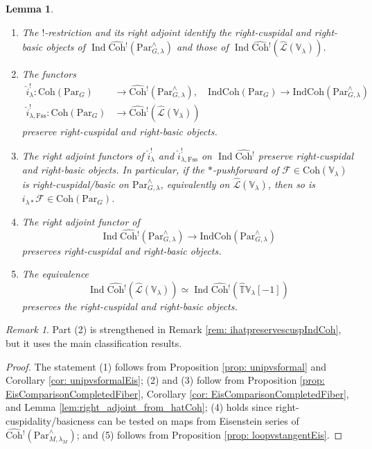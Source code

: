 \documentclass{amsart}
\newtheorem{lemma}[theorem]{Lemma}
\theoremstyle{definition}
\theoremstyle{remark}
\newtheorem{remark}[theorem]{Remark}
\numberwithin{equation}{section}
\DeclareMathOperator{\Ind}{Ind}
\newcommand{\mc}{\mathcal}
\newcommand{\wh}{\widehat}
\newcommand{\Par}{\mathrm{Par}}
\newcommand{\Fss}{\mathrm{Fss}}
\newcommand{\IndCoh}{\mathrm{IndCoh}}
\newcommand{\Coh}{\mathrm{Coh}}
\newcommand{\V}{\mathbb{V}}
\newcommand{\T}{\mathbb{T}}
\begin{document}
\begin{lemma}{\label{lem: ihatpreservescusp}}
\begin{enumerate} 
    \item The $!$-restriction and its right adjoint identify the right-cuspidal and right-basic objects of $\Ind\wh{\Coh}{}^! (\Par^\wedge_{G,\lambda})$ and those of $\Ind\wh{\Coh}{}^! (\wh{\mc L}(\V_\lambda))$. 
    \item The functors
\begin{align*}
\wh{i}_{\lambda}^!\colon \Coh(\Par_G) &\to \wh{\Coh}{}^! (\Par^\wedge_{G,\lambda}), \quad \IndCoh(\Par_G) \to \IndCoh (\Par^\wedge_{G,\lambda}) \\
\wh{i}_{\lambda, \Fss}^!\colon \Coh(\Par_G) &\to \wh{\Coh}{}^! (\wh{\mc L}(\V_\lambda))
\end{align*}
preserve right-cuspidal and right-basic objects. 
    \item The right adjoint functors of $\wh{i}_{\lambda}^!$ and $\wh{i}_{\lambda, \Fss}^!$ on $\Ind\wh{\Coh}{}^!$ preserve right-cuspidal and right-basic objects. In particular, if the $*$-pushforward of $\mc F\in \Coh(\V_\lambda)$ is right-cuspidal/basic on $\Par^\wedge_{G,\lambda}$, equivalently on $\wh{\mc L}(\V_\lambda)$, then so is $i_{\lambda*}\mc F\in \Coh(\Par_G)$.   
    \item The right adjoint functor of 
    \[
    \Ind\wh{\Coh}{}^!(\Par^\wedge_{G,\lambda}) \to \IndCoh(\Par^\wedge_{G,\lambda})
    \]
    preserves right-cuspidal and right-basic objects. 
    \item The equivalence 
    \[
    \Ind\wh{\Coh}{}^! (\wh{\mc L}(\V_\lambda))\simeq
    \Ind\wh{\Coh}{}^! (\wh{\T}\V_\lambda[-1]) 
    \]
    preserves the right-cuspidal and right-basic objects. 
\end{enumerate}
\end{lemma}

\begin{remark}
Part (2) is strengthened in Remark \ref{rem: ihatpreservescuspIndCoh}, but it uses the main classification results.     
\end{remark}

\begin{proof}
The statement (1) follows from Proposition \ref{prop: unipvsformal} and Corollary \ref{cor: unipvsformalEis}; (2) and (3) follow from Proposition \ref{prop: EisComparisonCompletedFiber}, Corollary \ref{cor: EisComparisonCompletedFiber}, and Lemma \ref{lem:right_adjoint_from_hatCoh}; (4) holds since right-cuspidality/basicness can be tested on maps from Eisenstein series of $\wh{\Coh}{}^!(\Par^\wedge_{M,\lambda_M})$; and (5) follows from Proposition \ref{prop: loopvstangentEis}. 
\end{proof}
\end{document}
